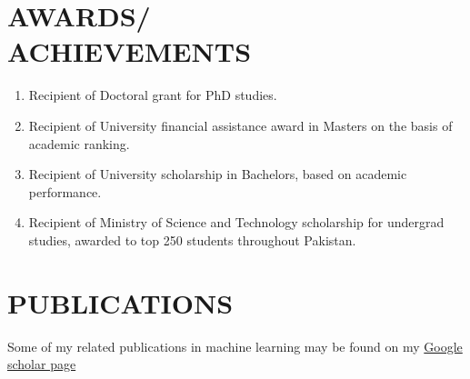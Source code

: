 \documentclass[margin, 10pt]{res} %
\begin{document}
\begin{resume}

\section{AWARDS/ \\ ACHIEVEMENTS} 

\begin{enumerate}
\item Recipient of Doctoral grant for PhD studies.
\item Recipient of University financial assistance award in Masters on the basis of academic ranking.
\item Recipient of University scholarship in Bachelors, based on academic performance.
\item Recipient of Ministry of Science and Technology scholarship for undergrad studies, awarded to top 250 students throughout Pakistan.
\end{enumerate} 


\section{PUBLICATIONS} 
Some of my related publications in machine learning may be found on my \href{https://scholar.google.com/citations?user=HjM0XDoAAAAJ&hl=en}{Google scholar page}




\end{resume}
\end{document}
